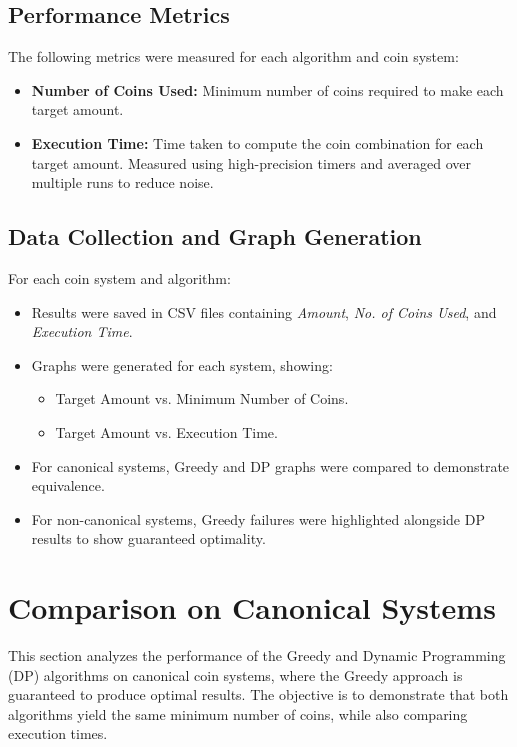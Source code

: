 \documentclass[12pt,a4paper]{report}
\begin{document}
\subsection{Performance Metrics}
The following metrics were measured for each algorithm and coin system:
\begin{itemize}
    \item \textbf{Number of Coins Used:} Minimum number of coins required to make each target amount.
    \item \textbf{Execution Time:} Time taken to compute the coin combination for each target amount. Measured using high-precision timers and averaged over multiple runs to reduce noise.
\end{itemize}

\subsection{Data Collection and Graph Generation}
For each coin system and algorithm:
\begin{itemize}
    \item Results were saved in CSV files containing \textit{Amount}, \textit{No. of Coins Used}, and \textit{Execution Time}.
    \item Graphs were generated for each system, showing:
        \begin{itemize}
            \item Target Amount vs. Minimum Number of Coins.
            \item Target Amount vs. Execution Time.
        \end{itemize}
    \item For canonical systems, Greedy and DP graphs were compared to demonstrate equivalence.
    \item For non-canonical systems, Greedy failures were highlighted alongside DP results to show guaranteed optimality.
\end{itemize}

\section{Comparison on Canonical Systems}
\label{sec:comparison_canonical}

This section analyzes the performance of the Greedy and Dynamic Programming (DP) algorithms on canonical coin systems, where the Greedy approach is guaranteed to produce optimal results. The objective is to demonstrate that both algorithms yield the same minimum number of coins, while also comparing execution times.
\end{document}
